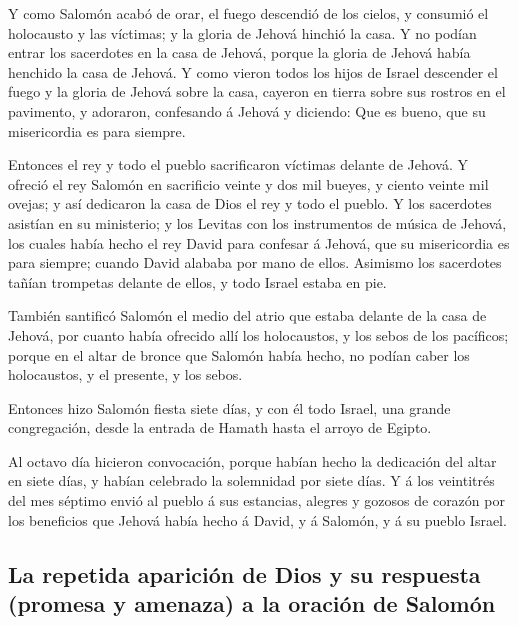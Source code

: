  Y como Salomón acabó de orar, el fuego descendió de los
cielos, y consumió el holocausto y las víctimas; y la gloria de Jehová
hinchió la casa.  Y no podían entrar los sacerdotes en la
casa de Jehová, porque la gloria de Jehová había henchido la casa de
Jehová.  Y como vieron todos los hijos de Israel descender
el fuego y la gloria de Jehová sobre la casa, cayeron en tierra sobre
sus rostros en el pavimento, y adoraron, confesando á Jehová y diciendo:
Que es bueno, que su misericordia es para siempre.

 Entonces el rey y todo el pueblo sacrificaron víctimas
delante de Jehová.  Y ofreció el rey Salomón en sacrificio
veinte y dos mil bueyes, y ciento veinte mil ovejas; y así dedicaron la
casa de Dios el rey y todo el pueblo.  Y los sacerdotes
asistían en su ministerio; y los Levitas con los instrumentos de música
de Jehová, los cuales había hecho el rey David para confesar á Jehová,
que su misericordia es para siempre; cuando David alababa por mano de
ellos. Asimismo los sacerdotes tañían trompetas delante de ellos, y todo
Israel estaba en pie.

 También santificó Salomón el medio del atrio que estaba
delante de la casa de Jehová, por cuanto había ofrecido allí los
holocaustos, y los sebos de los pacíficos; porque en el altar de bronce
que Salomón había hecho, no podían caber los holocaustos, y el presente,
y los sebos.

 Entonces hizo Salomón fiesta siete días, y con él todo
Israel, una grande congregación, desde la entrada de Hamath hasta el
arroyo de Egipto.

 Al octavo día hicieron convocación, porque habían hecho
la dedicación del altar en siete días, y habían celebrado la solemnidad
por siete días.  Y á los veintitrés del mes séptimo envió
al pueblo á sus estancias, alegres y gozosos de corazón por los
beneficios que Jehová había hecho á David, y á Salomón, y á su pueblo
Israel.

\hypertarget{la-repetida-apariciuxf3n-de-dios-y-su-respuesta-promesa-y-amenaza-a-la-oraciuxf3n-de-salomuxf3n}{%
\subsection{La repetida aparición de Dios y su respuesta (promesa y
amenaza) a la oración de
Salomón}\label{la-repetida-apariciuxf3n-de-dios-y-su-respuesta-promesa-y-amenaza-a-la-oraciuxf3n-de-salomuxf3n}}

